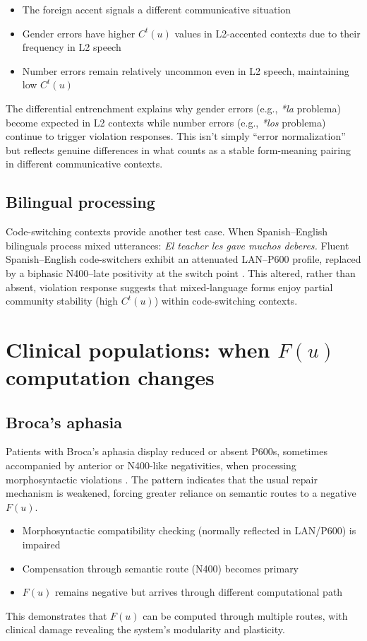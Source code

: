 \documentclass[12pt,letterpaper]{article}
\begin{document}
\begin{itemize}
    \item The foreign accent signals a different communicative situation
    \item Gender errors have higher $C^t(u)$ values in L2-accented contexts due to their frequency in L2 speech
    \item Number errors remain relatively uncommon even in L2 speech, maintaining low $C^t(u)$
\end{itemize}

The differential entrenchment explains why gender errors (e.g., \textit{*la} problema) become expected in L2 contexts while number errors (e.g., \textit{*los} problema) continue to trigger violation responses. This isn't simply \enquote{error normalization} but reflects genuine differences in what counts as a stable form-meaning pairing in different communicative contexts.

\subsection{Bilingual processing}
Code-switching contexts provide another test case. When Spanish--English bilinguals process mixed utterances:
\ea\label{ex:bilingual}
\textit{El teacher les gave muchos deberes.}
\z
Fluent Spanish--English code-switchers exhibit an attenuated LAN–P600 profile, replaced by a biphasic N400–late positivity at the switch point \autocite{Moreno2002}. This altered, rather than absent, violation response suggests that mixed-language forms enjoy partial community stability (high $C^t(u)$) within code-switching contexts.

\section{Clinical populations: when \texorpdfstring{$F(u)$}{F(u)} computation changes}
\subsection{Broca's aphasia}

Patients with Broca’s aphasia display reduced or absent P600s, sometimes accompanied by anterior or N400-like negativities, when processing morphosyntactic violations \autocite{Wassenaar2005,Kielar2012}. The pattern indicates that the usual repair mechanism is weakened, forcing greater reliance on semantic routes to a negative $F(u)$.

\begin{itemize}
    \item Morphosyntactic compatibility checking (normally reflected in LAN/P600) is impaired
    \item Compensation through semantic route (N400) becomes primary
    \item $F(u)$ remains negative but arrives through different computational path
\end{itemize}
This demonstrates that $F(u)$ can be computed through multiple routes, with clinical damage revealing the system's modularity and plasticity.
\end{document}
